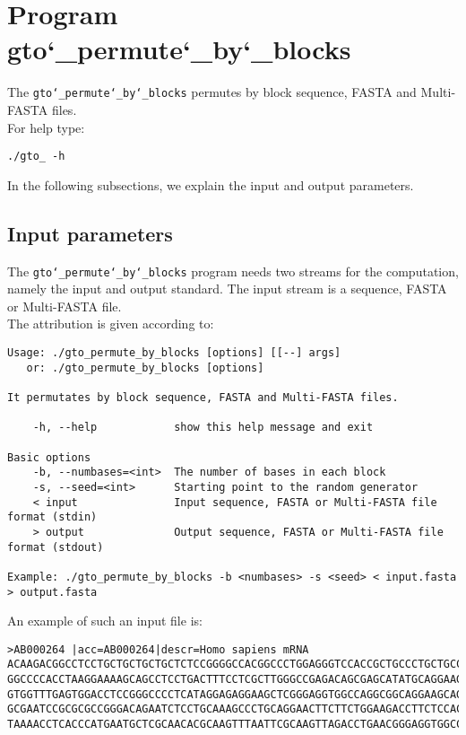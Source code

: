 \section{Program gto\char`_permute\char`_by\char`_blocks}
The \texttt{gto\char`_permute\char`_by\char`_blocks} permutes by block sequence, FASTA and Multi-FASTA files.\\
For help type:
\begin{lstlisting}
./gto_ -h
\end{lstlisting}
In the following subsections, we explain the input and output parameters.

\subsection*{Input parameters}

The \texttt{gto\char`_permute\char`_by\char`_blocks} program needs two streams for the computation, namely the input and output standard. The input stream is a sequence, FASTA or Multi-FASTA file.\\
The attribution is given according to:
\begin{lstlisting}
Usage: ./gto_permute_by_blocks [options] [[--] args]
   or: ./gto_permute_by_blocks [options]

It permutates by block sequence, FASTA and Multi-FASTA files.

    -h, --help            show this help message and exit

Basic options
    -b, --numbases=<int>  The number of bases in each block
    -s, --seed=<int>      Starting point to the random generator
    < input               Input sequence, FASTA or Multi-FASTA file format (stdin)
    > output              Output sequence, FASTA or Multi-FASTA file format (stdout)

Example: ./gto_permute_by_blocks -b <numbases> -s <seed> < input.fasta > output.fasta
\end{lstlisting}
An example of such an input file is:
\begin{lstlisting}
>AB000264 |acc=AB000264|descr=Homo sapiens mRNA 
ACAAGACGGCCTCCTGCTGCTGCTGCTCTCCGGGGCCACGGCCCTGGAGGGTCCACCGCTGCCCTGCTGCCATTGTCCCC
GGCCCCACCTAAGGAAAAGCAGCCTCCTGACTTTCCTCGCTTGGGCCGAGACAGCGAGCATATGCAGGAAGCGGCAGGAA
GTGGTTTGAGTGGACCTCCGGGCCCCTCATAGGAGAGGAAGCTCGGGAGGTGGCCAGGCGGCAGGAAGCAGGCCAGTGCC
GCGAATCCGCGCGCCGGGACAGAATCTCCTGCAAAGCCCTGCAGGAACTTCTTCTGGAAGACCTTCTCCACCCCCCCAGC
TAAAACCTCACCCATGAATGCTCGCAACACGCAAGTTTAATTCGCAAGTTAGACCTGAACGGGAGGTGGCCACGCAAGTT
\end{lstlisting}

